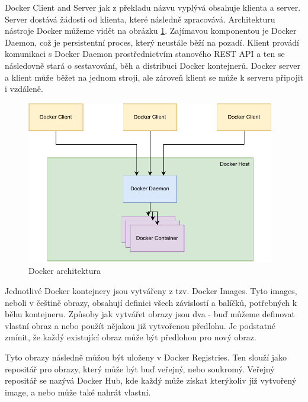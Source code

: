 Docker Client and Server jak z překladu názvu vyplývá obsahuje klienta a server. Server dostává žádosti od klienta, které následně zpracovává. Architekturu nástroje Docker můžeme vidět na obrázku \ref{fig:docker_arch}. Zajímavou komponentou je Docker Daemon, což je persistentní proces, který neustále běží na pozadí. Klient provádí komunikaci s Docker Daemon prostřednictvím stanového REST API a ten se následovně stará o sestavování, běh a distribuci Docker kontejnerů. Docker server a klient může běžet na jednom stroji, ale zároveň klient se může k serveru připojit i vzdáleně. 
\cite{turnbull2014docker}\cite{docker_overview}

\begin{figure}[htbp]
    \centering 
    \includegraphics[width=0.97\textwidth]{assets/img/docker_arch.pdf}
    \caption{Docker architektura}
    \label{fig:docker_arch}
\end{figure}

Jednotlivé Docker kontejnery jsou vytvářeny z tzv. Docker Images. Tyto images, neboli v češtině obrazy, obsahují definici všech závislostí a balíčků, potřebných k běhu kontejneru. Způsoby jak vytvářet obrazy jsou dva - buď můžeme definovat vlastní obraz a nebo použít nějakou již vytvořenou předlohu. Je podstatné zmínit, že každý existující obraz může být předlohou pro nový obraz. 

Tyto obrazy následně můžou být uloženy v Docker Registries. Ten slouží jako repositář pro obrazy, který může být buď veřejný, nebo soukromý. Veřejný repositář se nazývá Docker Hub, kde každý může získat kterýkoliv již vytvořený image, a nebo může také nahrát vlastní. \cite{turnbull2014docker} 

